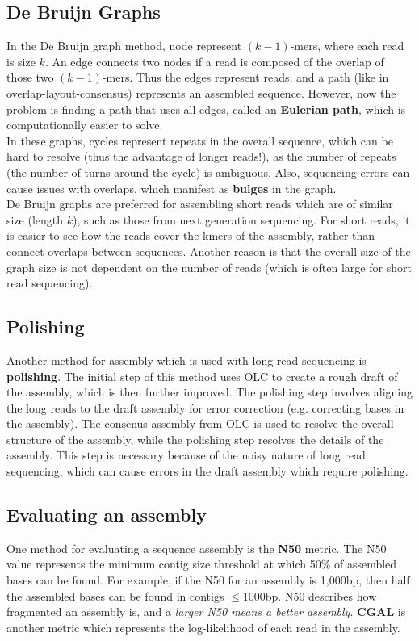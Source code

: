 \documentclass[12pt]{article}
\begin{document}
\subsection{De Bruijn Graphs}
In the De Bruijn graph method, node represent $(k-1)$-mers, where each read is size $k$. An edge connects two nodes if a read is composed of the overlap of those two $(k-1)$-mers. Thus the edges represent reads, and a path (like in overlap-layout-consensus) represents an assembled sequence. However, now the problem is finding a path that uses all edges, called an \textbf{Eulerian path}, which is computationally easier to solve.\\[10pt]
In these graphs, cycles represent repeats in the overall sequence, which can be hard to resolve (thus the advantage of longer reads!), as the number of repeats (the number of turns around the cycle) is ambiguous. Also, sequencing errors can cause issues with overlaps, which manifest as \textbf{bulges} in the graph.\\[10pt]
De Bruijn graphs are preferred for assembling short reads which are of similar size (length $k$), such as those from next generation sequencing. For short reads, it is easier to see how the reads cover the kmers of the assembly, rather than connect overlaps between sequences. Another reason is that the overall size of the graph size is not dependent on the number of reads (which is often large for short read sequencing). 

\subsection{Polishing}
Another method for assembly which is used with long-read sequencing is \textbf{polishing}. The initial step of this method uses OLC to create a rough draft of the assembly, which is then further improved. The polishing step involves aligning the long reads to the draft assembly for error correction (e.g. correcting bases in the assembly). The consenus assembly from OLC is used to resolve the overall structure of the assembly, while the polishing step resolves the details of the assembly. This step is necessary because of the noisy nature of long read sequencing, which can cause errors in the draft assembly which require polishing.

\subsection{Evaluating an assembly}
One method for evaluating a sequence assembly is the \textbf{N50} metric. The N50 value represents the minimum contig size threshold at which 50\% of assembled bases can be found. For example, if the N50 for an assembly is 1,000bp, then half the assembled bases can be found in contigs $\leq 1000$bp. N50 describes how fragmented an assembly is, and a \textit{larger N50 means a better assembly}. \textbf{CGAL} is another metric which represents the log-likelihood of each read in the assembly.
\end{document}
